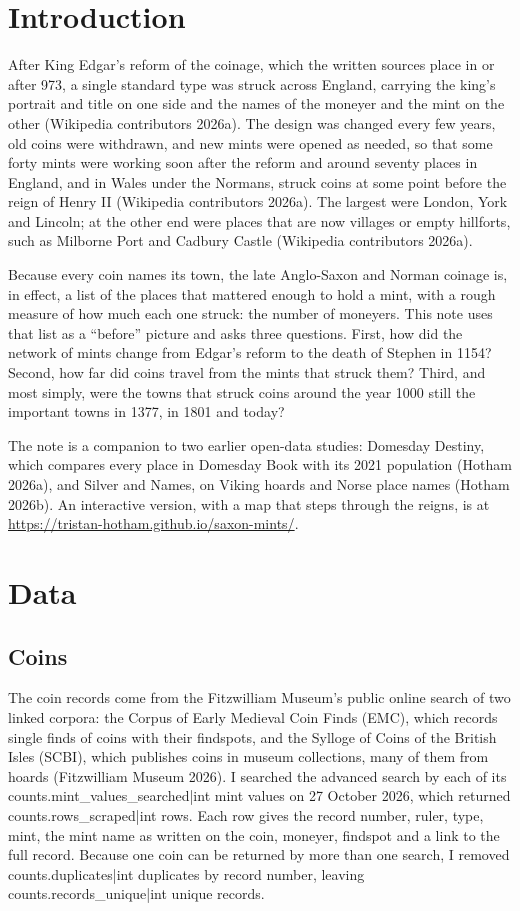 \documentclass[11pt,a4paper]{article}
\begin{document}
\section{Introduction}

After King Edgar's reform of the coinage, which the written sources place in or after 973, a single standard type was struck across England, carrying the king's portrait and title on one side and the names of the moneyer and the mint on the other (Wikipedia contributors 2026a). The design was changed every few years, old coins were withdrawn, and new mints were opened as needed, so that some forty mints were working soon after the reform and around seventy places in England, and in Wales under the Normans, struck coins at some point before the reign of Henry II (Wikipedia contributors 2026a). The largest were London, York and Lincoln; at the other end were places that are now villages or empty hillforts, such as Milborne Port and Cadbury Castle (Wikipedia contributors 2026a).

Because every coin names its town, the late Anglo-Saxon and Norman coinage is, in effect, a list of the places that mattered enough to hold a mint, with a rough measure of how much each one struck: the number of moneyers. This note uses that list as a ``before'' picture and asks three questions. First, how did the network of mints change from Edgar's reform to the death of Stephen in 1154? Second, how far did coins travel from the mints that struck them? Third, and most simply, were the towns that struck coins around the year 1000 still the important towns in 1377, in 1801 and today?

The note is a companion to two earlier open-data studies: Domesday Destiny, which compares every place in Domesday Book with its 2021 population (Hotham 2026a), and Silver and Names, on Viking hoards and Norse place names (Hotham 2026b). An interactive version, with a map that steps through the reigns, is at \url{https://tristan-hotham.github.io/saxon-mints/}.

\section{Data}

\subsection{Coins}

The coin records come from the Fitzwilliam Museum's public online search of two linked corpora: the Corpus of Early Medieval Coin Finds (EMC), which records single finds of coins with their findspots, and the Sylloge of Coins of the British Isles (SCBI), which publishes coins in museum collections, many of them from hoards (Fitzwilliam Museum 2026). I searched the advanced search by each of its {{counts.mint_values_searched|int}} mint values on 27 October 2026, which returned {{counts.rows_scraped|int}} rows. Each row gives the record number, ruler, type, mint, the mint name as written on the coin, moneyer, findspot and a link to the full record. Because one coin can be returned by more than one search, I removed {{counts.duplicates|int}} duplicates by record number, leaving {{counts.records_unique|int}} unique records.
\end{document}
